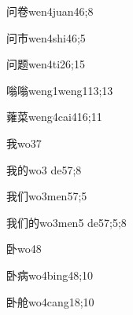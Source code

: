 \begin{verbete}{问卷}{wen4juan4}{6;8}
\end{verbete}

\begin{verbete}{问市}{wen4shi4}{6;5}
\end{verbete}

\begin{verbete}{问题}{wen4ti2}{6;15}
\end{verbete}

\begin{verbete}{嗡嗡}{weng1weng1}{13;13}
\end{verbete}

\begin{verbete}{蕹菜}{weng4cai4}{16;11}
\end{verbete}

\begin{verbete}{我}{wo3}{7}
\end{verbete}

\begin{verbete}{我的}{wo3 de5}{7;8}
\end{verbete}

\begin{verbete}{我们}{wo3men5}{7;5}
\end{verbete}

\begin{verbete}{我们的}{wo3men5 de5}{7;5;8}
\end{verbete}

\begin{verbete}{卧}{wo4}{8}
\end{verbete}

\begin{verbete}{卧病}{wo4bing4}{8;10}
\end{verbete}

\begin{verbete}{卧舱}{wo4cang1}{8;10}
\end{verbete}

